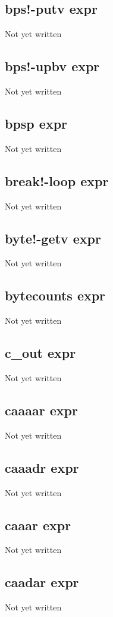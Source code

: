 \documentclass[a4paper,11pt]{article}
\begin{document}
\subsection{\ttfamily bps!-putv expr}
Not yet written

\subsection{\ttfamily bps!-upbv expr}
Not yet written

\subsection{\ttfamily bpsp expr}
Not yet written

\subsection{\ttfamily break!-loop expr}
Not yet written

\subsection{\ttfamily byte!-getv expr}
Not yet written

\subsection{\ttfamily bytecounts expr}
Not yet written

\subsection{\ttfamily c\_out expr}
Not yet written

\subsection{\ttfamily caaaar expr}
Not yet written

\subsection{\ttfamily caaadr expr}
Not yet written

\subsection{\ttfamily caaar expr}
Not yet written

\subsection{\ttfamily caadar expr}
Not yet written
\end{document}

